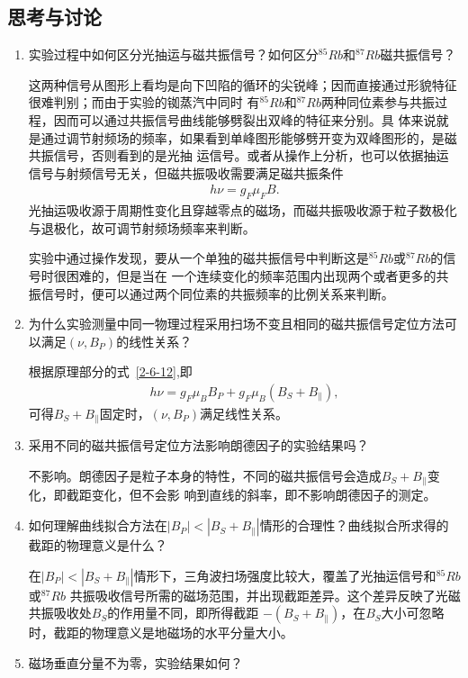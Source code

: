 \documentclass[11pt,a4paper]{article}
\begin{document}
\begin{spacing}{1.3}
\begin{CJK*}{UTF8}{gbsn}
\section{思考与讨论}
\begin{enumerate}
\item 实验过程中如何区分光抽运与磁共振信号？如何区分$^{85}Rb$和$^{87}Rb$磁共振信号？\par 
这两种信号从图形上看均是向下凹陷的循环的尖锐峰；因而直接通过形貌特征很难判别；而由于实验的铷蒸汽中同时
有$^{85}Rb$和$^{87}Rb$两种同位素参与共振过程，因而可以通过共振信号曲线能够劈裂出双峰的特征来分别。具
体来说就是通过调节射频场的频率，如果看到单峰图形能够劈开变为双峰图形的，是磁共振信号，否则看到的是光抽
运信号。或者从操作上分析，也可以依据抽运信号与射频信号无关，但磁共振吸收需要满足磁共振条件
\begin{eqnarray} 
h\nu = g_F\mu_FB.
\end{eqnarray}
光抽运吸收源于周期性变化且穿越零点的磁场，而磁共振吸收源于粒子数极化与退极化，故可调节射频场频率来判断。\par
实验中通过操作发现，要从一个单独的磁共振信号中判断这是$^{85}Rb$或$^{87}Rb$的信号时很困难的，但是当在
一个连续变化的频率范围内出现两个或者更多的共振信号时，便可以通过两个同位素的共振频率的比例关系来判断。\par 
\item 为什么实验测量中同一物理过程采用扫场不变且相同的磁共振信号定位方法可以满足$(\nu,B_P)$的线性关系？\par 
根据原理部分的式~\eqref{2-6-12},即
\begin{eqnarray} 
h\nu=g_F\mu_BB_P+g_F\mu_B(B_S+B_{\parallel}),
\end{eqnarray}
可得$B_S+B_{\parallel}$固定时，$(\nu,B_P)$满足线性关系。
\item  采用不同的磁共振信号定位方法影响朗德因子的实验结果吗？\par 
不影响。朗德因子是粒子本身的特性，不同的磁共振信号会造成$B_S+B_{\parallel}$变化，即截距变化，但不会影
响到直线的斜率，即不影响朗德因子的测定。
\item  如何理解曲线拟合方法在$|B_P|<|B_S+B_{\parallel}|$情形的合理性？曲线拟合所求得的截距的物理意义是什么？\par 
在$|B_P|<|B_S+B_{\parallel}|$情形下，三角波扫场强度比较大，覆盖了光抽运信号和$^{85}Rb$或$^{87}Rb$
共振吸收信号所需的磁场范围，并出现截距差异。这个差异反映了光磁共振吸收处$B_S$的作用量不同，即所得截距
$-(B_S+B_{\parallel})$，在$B_S$大小可忽略时，截距的物理意义是地磁场的水平分量大小。
\item  磁场垂直分量不为零，实验结果如何？\par 

\end{enumerate}
\end{CJK*}
\end{spacing}
\end{document}
